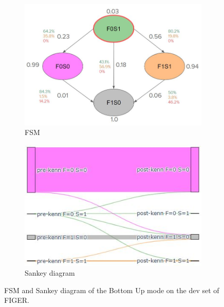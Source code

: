 \begin{figure}
     \centering
     \begin{subfigure}{0.7\textwidth}
         \centering
         \includegraphics[width=\textwidth]{figures/fsm_bottom_up.JPG}
         \caption{FSM}
         \label{fig:fsm_bottom_up}
         \vspace{15px}
     \end{subfigure}
     \vfill
     \begin{subfigure}{0.6\textwidth}
         \centering
         \includegraphics[width=\textwidth]{figures/sankey_bottom_up.JPG}
         \caption{Sankey diagram}
         \label{fig:sankey_bottom_up}
     \end{subfigure}
        \caption{FSM and Sankey diagram of the Bottom Up mode on the dev set of FIGER.}
        \label{fig:transitions_bottom_up}
\end{figure}

